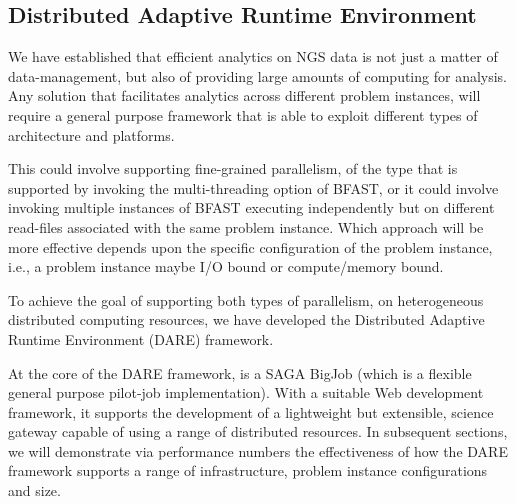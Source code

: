 \documentclass{sig-alternate}
\begin{document}


\subsection{Distributed Adaptive Runtime Environment}

We have established that efficient analytics on NGS data is not just a
matter of data-management, but also of providing large amounts of
computing for analysis. Any solution that facilitates analytics across
different problem instances, will require a general purpose framework
that is able to exploit different types of architecture and platforms.


 
This could involve supporting fine-grained parallelism, of the type
that is supported by invoking the multi-threading option of BFAST, or
it could involve invoking multiple instances of BFAST executing
independently but on different read-files associated with the same
problem instance. Which approach will be more effective depends upon
the specific configuration of the problem instance, i.e., a problem
instance maybe I/O bound or compute/memory bound.

To achieve the goal of supporting both types of parallelism, on
heterogeneous distributed computing resources, we have developed the
Distributed Adaptive Runtime Environment (DARE)
framework\cite{dareurl}.  

At the core of the DARE framework, is a SAGA BigJob (which is a
flexible general purpose pilot-job
implementation)\cite{saga-ccgrid10,saga-royalsoc,saga-web,jha2009developing,ecmls10}.
With a suitable Web development framework, it supports the development
of a lightweight but extensible, science gateway capable of using a
range of distributed resources.  In subsequent sections, we will
demonstrate via performance numbers the effectiveness of how the DARE
framework supports a range of infrastructure, problem instance
configurations and size.
\end{document}
